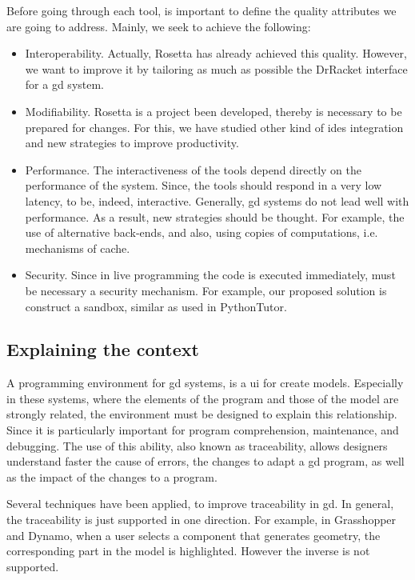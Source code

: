 Before going through each tool, is important to define the quality attributes we are going to address. Mainly, we seek to achieve the following:

\begin{itemize}
 \item Interoperability. Actually, Rosetta has already achieved this quality. However, we want to improve it by tailoring as much as possible the DrRacket interface for a \ac{gd} system.
 
 \item Modifiability. Rosetta is a project been developed, thereby is necessary to be prepared for changes. For this, we have studied other kind of \ac{ide}s integration and new strategies to improve productivity.
 
 \item Performance. The interactiveness of the tools depend directly on the performance of the system. Since, the tools should respond in a very low latency, to be, indeed, interactive. Generally, \ac{gd} systems do not lead well with performance. As a result, new strategies should be thought. For example, the use of alternative back-ends, and also, using copies of computations, i.e. mechanisms of cache.  
 
 \item Security. Since in live programming the code is executed immediately, must be necessary a security mechanism. For example, our proposed solution is construct a sandbox, similar as used in PythonTutor.
\end{itemize}

\subsection{Explaining the context}

A programming environment for \ac{gd} systems, is a \ac{ui} for create models. Especially in these systems, where the elements of the program and those of the model are strongly related, the environment must be designed to explain this relationship. Since it is particularly important for program comprehension, maintenance, and debugging. The use of this ability, also known as traceability, allows designers understand faster the cause of errors, the changes to adapt a \ac{gd} program, as well as the impact of the changes to a program.

Several techniques have been applied, to improve traceability in \ac{gd}. In general, the traceability is just supported in one direction. For example, in Grasshopper and Dynamo, when a user selects a component that generates geometry, the corresponding part in the model is highlighted. However the inverse is not supported.


